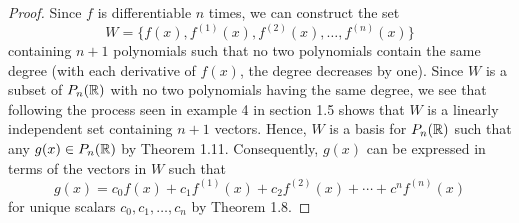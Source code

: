 \begin{proof}
    Since \( f \) is differentiable \( n  \) times, we can construct the set 
    \[  W = \{ f(x), f^{(1)}(x) , f^{(2)}(x), \dots, f^{(n)}(x) \}  \] containing \( n + 1  \) polynomials such that no two polynomials contain the same degree (with each derivative of \( f(x) \), the degree decreases by one). Since \( W  \) is a subset of \( P_{n}(\mathbb{R}) \) with no two polynomials having the same degree, we see that following the process seen in example 4 in section 1.5 shows that \( W  \) is a linearly independent set containing \( n + 1  \) vectors. Hence, \( W  \) is a basis for \( P_{n}(\mathbb{R}) \) such that any \( g(x) \in P_{n}(\mathbb{R}) \) by Theorem 1.11. Consequently, \( g(x) \) can be expressed in terms of the vectors in \( W  \) such that  
    \[  g(x) = c_{0} f(x) + c_{1} f^{(1)}(x) + c_{2} f^{(2)}(x) + \cdots + c^{n} f^{(n)}(x)  \]
    for unique scalars \( c_{0}, c_{1}, \dots, c_{n} \) by Theorem 1.8. 
\end{proof}
